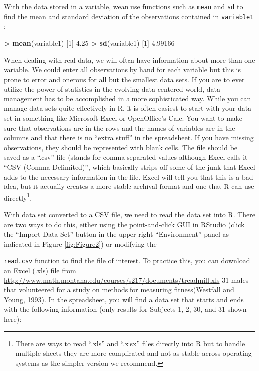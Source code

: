 \documentclass[]{book}
\newenvironment{Shaded}{\begin{snugshade}}{\end{snugshade}}
\newcommand{\KeywordTok}[1]{\textcolor[rgb]{0.13,0.29,0.53}{\textbf{#1}}}
\newcommand{\DecValTok}[1]{\textcolor[rgb]{0.00,0.00,0.81}{#1}}
\newcommand{\FloatTok}[1]{\textcolor[rgb]{0.00,0.00,0.81}{#1}}
\newcommand{\StringTok}[1]{\textcolor[rgb]{0.31,0.60,0.02}{#1}}
\newcommand{\OperatorTok}[1]{\textcolor[rgb]{0.81,0.36,0.00}{\textbf{#1}}}
\newcommand{\NormalTok}[1]{#1}
\let\rmarkdownfootnote\footnote%
\def\footnote{\protect\rmarkdownfootnote}
\begin{document}
With the data stored in a variable, wean use functions such as
\texttt{mean} and \texttt{sd} to find the mean and standard deviation of
the observations contained in \texttt{variable1} :

\begin{Shaded}
\begin{Highlighting}[]
\OperatorTok{>}\StringTok{ }\KeywordTok{mean}\NormalTok{(variable1)}
\NormalTok{[}\DecValTok{1}\NormalTok{] }\FloatTok{4.25}
\OperatorTok{>}\StringTok{ }\KeywordTok{sd}\NormalTok{(variable1)}
\NormalTok{[}\DecValTok{1}\NormalTok{] }\FloatTok{4.99166}
\end{Highlighting}
\end{Shaded}

When dealing with real data, we will often have information about more
than one variable. We could enter all observations by hand for each
variable but this is prone to error and onerous for all but the smallest
data sets. If you are to ever utilize the power of statistics in the
evolving data-centered world, data management has to be accomplished in
a more sophisticated way. While you can manage data sets quite
effectively in R, it is often easiest to start with your data set in
something like Microsoft Excel or OpenOffice's Calc. You want to make
sure that observations are in the rows and the names of variables are in
the columns and that there is no ``extra stuff'' in the spreadsheet. If
you have missing observations, they should be represented with blank
cells. The file should be saved as a ``.csv'' file (stands for
comma-separated values although Excel calls it ``CSV (Comma
Delimited)'', which basically strips off some of the junk that Excel
adds to the necessary information in the file. Excel will tell you that
this is a bad idea, but it actually creates a more stable archival
format and one that R can use directly\footnote{There are ways to read
  ``.xls'' and ``.xlsx'' files directly into R but to handle multiple
  sheets they are more complicated and not as stable across operating
  systems as the simpler version we recommend.}.

With data set converted to a CSV file, we need to read the data set into
R. There are two ways to do this, either using the point-and-click GUI
in RStudio (click the ``Import Data Set'' button in the upper right
``Environment'' panel as indicated in Figure \ref{fig:Figure2}) or
modifying the

\texttt{read.csv} function to find the file of interest. To practice
this, you can download an Excel (.xls) file from
\url{http://www.math.montana.edu/courses/s217/documents/treadmill.xls}
31 males that volunteered for a study on methods for measuring
fitness(Westfall and Young, 1993). In the spreadsheet, you will find a
data set that starts and ends with the following information (only
results for Subjects 1, 2, 30, and 31 shown here):
\end{document}

